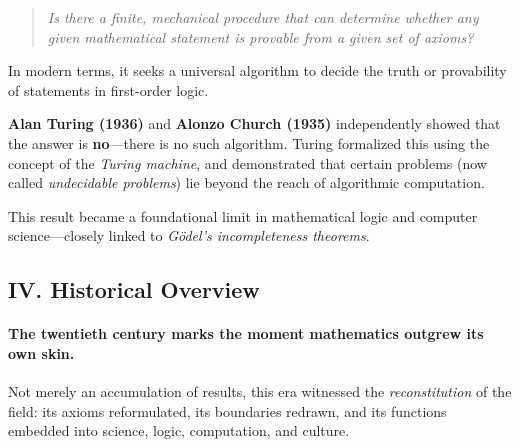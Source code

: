\documentclass[9pt]{article}
\begin{document}
\begin{quote}
\textit{Is there a finite, mechanical procedure that can determine whether any given mathematical statement is provable from a given set of axioms?}
\end{quote}

In modern terms, it seeks a universal algorithm to decide the truth or provability of statements in first-order logic.

\medskip

\noindent \textbf{Alan Turing (1936)} and \textbf{Alonzo Church (1935)} independently showed that the answer is \textbf{no}---there is no such algorithm. Turing formalized this using the concept of the \textit{Turing machine}, and demonstrated that certain problems (now called \textit{undecidable problems}) lie beyond the reach of algorithmic computation.

\medskip

This result became a foundational limit in mathematical logic and computer science---closely linked to \textit{Gödel’s incompleteness theorems}.

\newpage

\subsection*{IV. Historical Overview}

\paragraph{
The twentieth century marks the moment mathematics outgrew its own skin.}

Not merely an accumulation of results, this era witnessed the \textit{reconstitution} of the field: its axioms reformulated, its boundaries redrawn, and its functions embedded into science, logic, computation, and culture.
\end{document}
